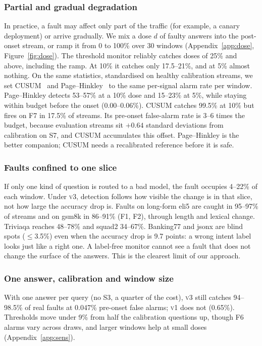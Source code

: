 \documentclass[11pt]{article}
\newcommand{\vone}{\textsc{v1}}
\newcommand{\vthree}{\textsc{v3}}
\begin{document}
\subsubsection{Partial and gradual degradation}
\label{sec:seq}
In practice, a fault may affect only part of the traffic (for example, a
canary deployment) or arrive gradually. We mix a dose $d$ of faulty answers into
the post-onset stream, or ramp it from 0 to 100\% over 30 windows
(Appendix~\ref{app:dose}, Figure~\ref{fig:dose}). The threshold monitor reliably catches doses of 25\% and
above, including the ramp. At 10\% it catches only 17.5--21\%, and at 5\% almost
nothing. On the same statistics, standardised on healthy calibration streams, we
set CUSUM~\citep{page1954continuous} and
Page--Hinkley~\citep{hinkley1971inference} to the same per-signal alarm rate per
window. Page--Hinkley detects 53--57\% at a 10\% dose and 15--23\% at 5\%, while
staying within budget before the onset (0.00--0.06\%). CUSUM catches 99.5\% at 10\%
but fires on F7 in 17.5\% of streams. Its pre-onset false-alarm rate is 3--6 times
the budget, because evaluation streams sit $+0.64$ standard deviations from
calibration on S7, and CUSUM accumulates this offset. Page--Hinkley is the better
companion; CUSUM needs a recalibrated reference before it is safe.



\subsubsection{Faults confined to one slice}
\label{sec:slice}
If only one kind of question is routed to a bad model, the fault occupies 4--22\%
of each window. Under \vthree{}, detection follows how visible the change is in
that slice, not how large the accuracy drop is. Faults on long-form eli5 are
caught in 95--97\% of streams and on gsm8k in 86--91\% (F1, F2), through length and
lexical change. Triviaqa reaches 48--78\% and squad2 34--67\%. Banking77 and
\textsf{jsonx} are blind spots ($\le$3.5\%) even when the accuracy drop is 9.7
points: a wrong intent label looks just like a right one. A label-free monitor
cannot see a fault that does not change the surface of the answers. This is the
clearest limit of our approach.

\subsubsection{One answer, calibration and window size}
\label{sec:oneanswer}
With one answer per query (no S3, a quarter of the cost), \vthree{} still catches
94--98.5\% of real faults at 0.047\% pre-onset false alarms; \vone{} does not
(0.65\%). Thresholds move under 9\% from half the calibration questions up, though F6
alarms vary across draws, and larger windows help at small doses (Appendix~\ref{app:sens}).
\end{document}
